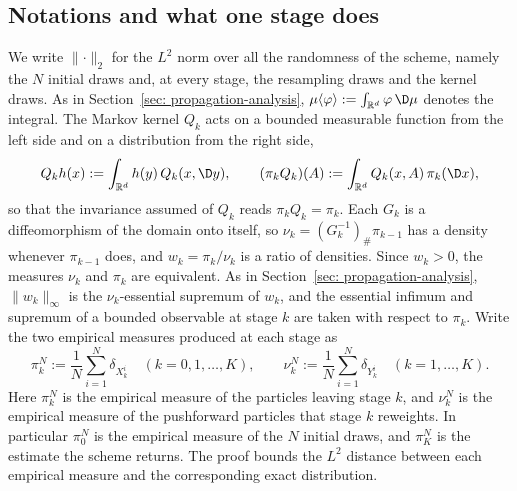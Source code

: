 \documentclass{article}
\begin{document}
\subsection{Notations and what one stage does}
\label{subsec: appendix-notation}

We write $\lVert\cdot\rVert_2$ for the $L^2$ norm over all the randomness of the scheme, namely the $N$ initial draws and, at every stage, the resampling draws and the kernel draws. As in Section~\ref{sec: propagation-analysis}, $\mu\langle \varphi\rangle:=\int_{\mathbb R^d}\varphi\,\D\mu$ denotes the integral. The Markov kernel $Q_k$ acts on a bounded measurable function from the left side and on a distribution from the right side,
\begin{equation}
    Q_kh(x) := \int_{\mathbb R^d} h(y)\,Q_k(x,\D y) ,
    \qquad
    (\pi_kQ_k)(A) := \int_{\mathbb R^d} Q_k(x,A)\,\pi_k(\D x) ,
    \label{eq: appendix-kernel}
\end{equation}
so that the invariance assumed of $Q_k$ reads $\pi_kQ_k=\pi_k$. Each $G_k$ is a diffeomorphism of the domain onto itself, so $\nu_k=(G_k^{-1})_{\#}\pi_{k-1}$ has a density whenever $\pi_{k-1}$ does, and $w_k=\pi_k/\nu_k$ is a ratio of densities. Since $w_k>0$, the measures $\nu_k$ and $\pi_k$ are equivalent. As in Section~\ref{sec: propagation-analysis}, $\lVert w_k\rVert_\infty$ is the $\nu_k$-essential supremum of $w_k$, and the essential infimum and supremum of a bounded observable at stage $k$ are taken with respect to $\pi_k$. Write the two empirical measures produced at each stage as
\begin{equation}
    \pi_k^N := \frac1N\sum_{i=1}^{N}\delta_{X_k^i}
    \quad (k=0,1,\dots,K),
    \qquad
    \nu_k^N := \frac1N\sum_{i=1}^{N}\delta_{Y_k^i}
    \quad (k=1,\dots,K) .
    \label{eq: appendix-empirical}
\end{equation}
Here $\pi_k^N$ is the empirical measure of the particles leaving stage $k$, and $\nu_k^N$ is the empirical measure of the pushforward particles that stage $k$ reweights. In particular $\pi_0^N$ is the empirical measure of the $N$ initial draws, and $\pi_K^N$ is the estimate the scheme returns. The proof bounds the $L^2$ distance between each empirical measure and the corresponding exact distribution.
\end{document}

